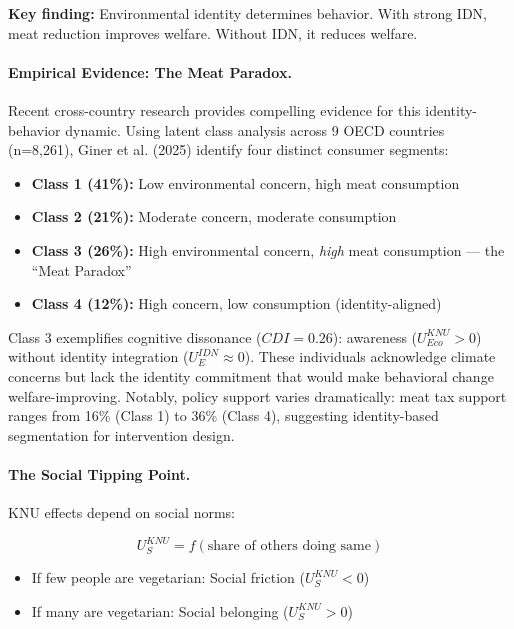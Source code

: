 \textbf{Key finding:} Environmental identity determines behavior.
With strong IDN, meat reduction improves welfare.
Without IDN, it reduces welfare.

\paragraph{Empirical Evidence: The Meat Paradox.}
Recent cross-country research \citep{giner2025sustainable} provides compelling evidence for this identity-behavior dynamic. Using latent class analysis across 9 OECD countries (n=8,261), Giner et al. (2025) identify four distinct consumer segments:
\begin{itemize}
\item \textbf{Class 1 (41\%):} Low environmental concern, high meat consumption
\item \textbf{Class 2 (21\%):} Moderate concern, moderate consumption
\item \textbf{Class 3 (26\%):} High environmental concern, \emph{high} meat consumption --- the ``Meat Paradox''
\item \textbf{Class 4 (12\%):} High concern, low consumption (identity-aligned)
\end{itemize}

Class 3 exemplifies cognitive dissonance ($CDI = 0.26$): awareness ($U^{KNU}_{Eco} > 0$) without identity integration ($U^{IDN}_{E} \approx 0$). These individuals acknowledge climate concerns but lack the identity commitment that would make behavioral change welfare-improving. Notably, policy support varies dramatically: meat tax support ranges from 16\% (Class 1) to 36\% (Class 4), suggesting identity-based segmentation for intervention design.

\paragraph{The Social Tipping Point.}
KNU effects depend on social norms:

\begin{equation}
U^{KNU}_{S} = f(\text{share of others doing same})
\end{equation}

\begin{itemize}
\item If few people are vegetarian: Social friction ($U^{KNU}_S < 0$)
\item If many are vegetarian: Social belonging ($U^{KNU}_S > 0$)
\end{itemize}

